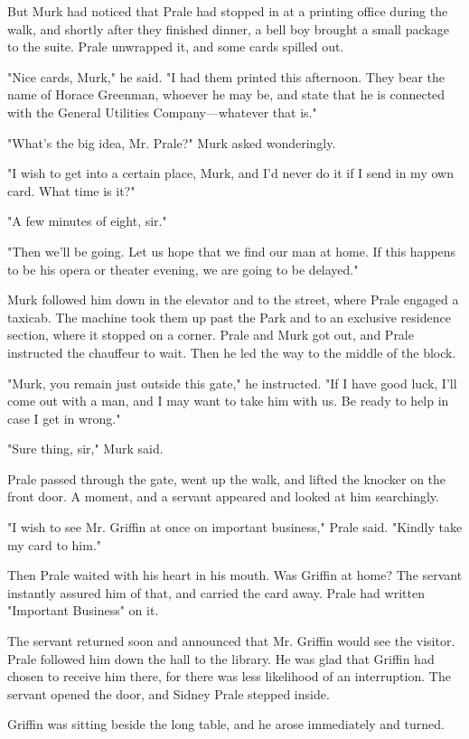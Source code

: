 \documentclass{novel}
\begin{document}
But Murk had noticed that Prale had stopped in at a printing office during the walk, and shortly after they finished dinner, a bell boy brought a small package to the suite. Prale unwrapped it, and some cards spilled out.

"Nice cards, Murk," he said. "I had them printed this afternoon. They bear the name of Horace Greenman, whoever he may be, and state that he is connected with the General Utilities Company---whatever that is."

"What's the big idea, Mr. Prale?" Murk asked wonderingly.

"I wish to get into a certain place, Murk, and I'd never do it if I send in my own card. What time is it?"

"A few minutes of eight, sir."

"Then we'll be going. Let us hope that we find our man at home. If this happens to be his opera or theater evening, we are going to be delayed."

Murk followed him down in the elevator and to the street, where Prale engaged a taxicab. The machine took them up past the Park and to an exclusive residence section, where it stopped on a corner. Prale and Murk got out, and Prale instructed the chauffeur to wait. Then he led the way to the middle of the block.

"Murk, you remain just outside this gate," he instructed. "If I have good luck, I'll come out with a man, and I may want to take him with us. Be ready to help in case I get in wrong."

"Sure thing, sir," Murk said.

Prale passed through the gate, went up the walk, and lifted the knocker on the front door. A moment, and a servant appeared and looked at him searchingly.

"I wish to see Mr. Griffin at once on important business," Prale said. "Kindly take my card to him."

Then Prale waited with his heart in his mouth. Was Griffin at home? The servant instantly assured him of that, and carried the card away. Prale had written "Important Business" on it.

The servant returned soon and announced that Mr. Griffin would see the visitor. Prale followed him down the hall to the library. He was glad that Griffin had chosen to receive him there, for there was less likelihood of an interruption. The servant opened the door, and Sidney Prale stepped inside.

Griffin was sitting beside the long table, and he arose immediately and turned.
\end{document}
